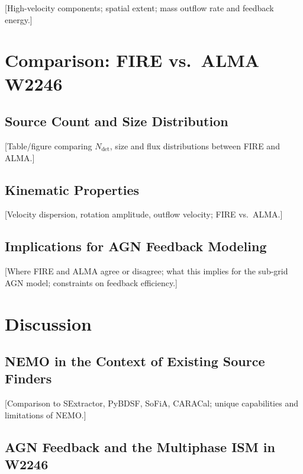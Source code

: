 \documentclass{aa}
\begin{document}
[High-velocity components; spatial extent; mass outflow rate and feedback energy.]

\section{Comparison: FIRE vs.\ ALMA W2246}
\label{sec:comparison}

\subsection{Source Count and Size Distribution}
\label{sec:comparison_sources}

[Table/figure comparing $N_{\mathrm{det}}$, size and flux distributions between FIRE and ALMA.]

\subsection{Kinematic Properties}
\label{sec:comparison_kinematics}

[Velocity dispersion, rotation amplitude, outflow velocity; FIRE vs.\ ALMA.]

\subsection{Implications for AGN Feedback Modeling}
\label{sec:comparison_feedback}

[Where FIRE and ALMA agree or disagree; what this implies for the sub-grid AGN model; constraints on feedback efficiency.]

\section{Discussion}
\label{sec:discussion}

\subsection{NEMO in the Context of Existing Source Finders}
\label{sec:discussion_context}

[Comparison to SExtractor, PyBDSF, SoFiA, CARACal; unique capabilities and limitations of NEMO.]

\subsection{AGN Feedback and the Multiphase ISM in W2246}
\label{sec:discussion_feedback}
\end{document}
